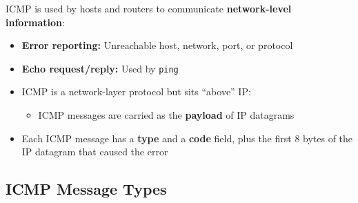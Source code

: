 \begin{keybox}
ICMP is used by hosts and routers to communicate \textbf{network-level information}:
\begin{itemize}[noitemsep]
    \item \textbf{Error reporting:} Unreachable host, network, port, or protocol
    \item \textbf{Echo request/reply:} Used by \texttt{ping}
    \item ICMP is a network-layer protocol but sits ``above'' IP:
    \begin{itemize}[noitemsep]
        \item ICMP messages are carried as the \textbf{payload} of IP datagrams
    \end{itemize}
    \item Each ICMP message has a \textbf{type} and a \textbf{code} field, plus the first 8 bytes of the IP datagram that caused the error
\end{itemize}
\end{keybox}

\subsection{ICMP Message Types}


